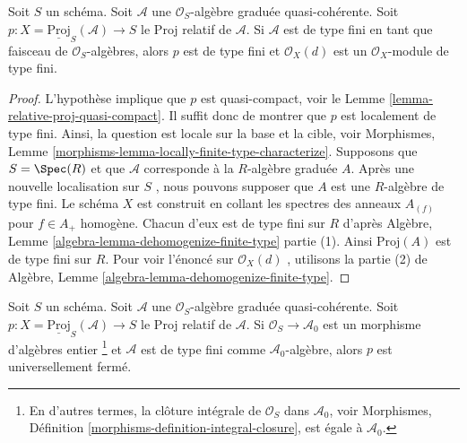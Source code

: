 \begin{lemma}
\label{lemma-relative-proj-finite-type}
Soit  $S$  un schéma. Soit  $\mathcal{A}$  une  $\mathcal{O}_S$-algèbre graduée
quasi-cohérente. Soit  $p : X = \underline{\text{Proj}}_S(\mathcal{A}) \to S$  le Proj relatif de  $\mathcal{A}$. Si
 $\mathcal{A}$  est de type fini en tant que faisceau de  $\mathcal{O}_S$-algèbres, alors
 $p$  est de type fini et  $\mathcal{O}_X(d)$  est un  $\mathcal{O}_X$-module de type
fini.
\end{lemma}

\begin{proof}
L'hypothèse implique que  $p$  est quasi-compact, voir le Lemme
 \ref{lemma-relative-proj-quasi-compact}. Il suffit donc de montrer que  $p$  est localement de type
fini. Ainsi, la question est locale sur la base et la cible, voir Morphismes,
Lemme  \ref{morphisms-lemma-locally-finite-type-characterize}. Supposons que  $S = \Spec(R)$  et que  $\mathcal{A}$  corresponde à
la  $R$-algèbre graduée  $A$. Après une nouvelle localisation sur
 $S$ , nous pouvons supposer que  $A$  est une  $R$-algèbre
de type fini. Le schéma  $X$  est construit en collant les spectres des
anneaux  $A_{(f)}$  pour  $f \in A_{+}$  homogène. Chacun d'eux est de type fini sur
 $R$  d'après Algèbre, Lemme  \ref{algebra-lemma-dehomogenize-finite-type}  partie (1). Ainsi  $\text{Proj}(A)$ 
est de type fini sur  $R$. Pour voir l'énoncé sur  $\mathcal{O}_X(d)$ , utilisons
la partie (2) de Algèbre, Lemme  \ref{algebra-lemma-dehomogenize-finite-type}.
\end{proof}

\begin{lemma}
\label{lemma-relative-proj-universally-closed}
Soit  $S$  un schéma. Soit  $\mathcal{A}$  une  $\mathcal{O}_S$-algèbre graduée
quasi-cohérente. Soit  $p : X = \underline{\text{Proj}}_S(\mathcal{A}) \to S$  le Proj relatif de  $\mathcal{A}$. Si
 $\mathcal{O}_S \to \mathcal{A}_0$  est un morphisme d'algèbres entier \footnote{ En
d'autres termes, la clôture intégrale de  $\mathcal{O}_S$  dans  $\mathcal{A}_0$, voir
Morphismes, Définition  \ref{morphisms-definition-integral-closure}, est égale à  $\mathcal{A}_0$. }  et
 $\mathcal{A}$  est de type fini comme  $\mathcal{A}_0$-algèbre, alors  $p$  est
universellement fermé.
\end{lemma}


